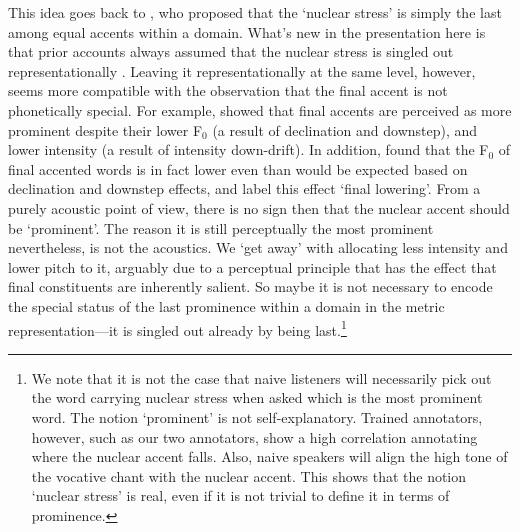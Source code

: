 \documentclass[preprint,review,12pt,authoryear,times]{elsarticle}
\begin{document}
This idea goes back to \citet[][]{newma46}, who proposed that the `nuclear stress' is simply the last among equal accents within a domain. What's new in the presentation here is that prior accounts always assumed that the nuclear stress is singled out representationally \citep[e.g.][]{SPE, truck95}. Leaving it representationally at the same level, however, seems more compatible with the observation that the final accent is not phonetically special. For example, \citet{pierr79} showed that final accents are perceived as more prominent despite their lower F$_0$ (a result of declination and downstep), and lower  intensity (a result of intensity down-drift). In addition, \citet{liber84} found  that the F$_0$ of final accented words is in fact lower even than would be expected based on declination and downstep effects, and label this effect `final lowering'. From a purely acoustic point of view, there is no sign then that the nuclear accent should be  `prominent'. The reason it is still perceptually the most prominent nevertheless, is not the acoustics. We `get away' with allocating less intensity and lower pitch to it, arguably due to a perceptual principle that has the effect that final constituents are inherently salient. So maybe it is not necessary to encode the special status of the last prominence within a domain in the metric representation---it is singled out already by being last.\footnote{We note that it is not the case that naive listeners will necessarily pick out the word carrying nuclear stress when asked which is the most prominent word. The notion `prominent' is not self-explanatory. Trained annotators, however, such as our two annotators, show a high correlation annotating where the nuclear accent falls. Also, naive speakers will align the high tone of the vocative chant with the nuclear accent. This shows that the notion `nuclear stress' is real, even if it is not trivial to define it in terms of prominence.}   
\end{document}
